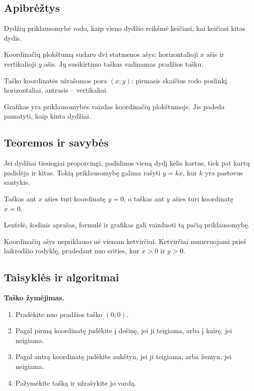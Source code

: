 \subsection{Apibrėžtys}
\begin{apibreztis}
Dydžių priklausomybė rodo, kaip vieno dydžio reikšmė keičiasi, kai keičiasi kitas dydis.
\end{apibreztis}
\begin{apibreztis}
Koordinačių plokštumą sudaro dvi statmenos ašys: horizontalioji \(x\) ašis ir vertikalioji \(y\) ašis. Jų susikirtimo taškas vadinamas pradžios tašku.
\end{apibreztis}
\begin{apibreztis}
Taško koordinatės užrašomos pora \((x;y)\): pirmasis skaičius rodo poslinkį horizontaliai, antrasis -- vertikaliai.
\end{apibreztis}
\begin{apibreztis}
Grafikas yra priklausomybės vaizdas koordinačių plokštumoje. Jis padeda pamatyti, kaip kinta dydžiai.
\end{apibreztis}

\subsection{Teoremos ir savybės}
\begin{savybe}
Jei dydžiai tiesiogiai proporcingi, padidinus vieną dydį kelis kartus, tiek pat kartų padidėja ir kitas. Tokią priklausomybę galima rašyti \(y=kx\), kur \(k\) yra pastovus santykis.
\end{savybe}
\begin{savybe}
Taškas ant \(x\) ašies turi koordinatę \(y=0\), o taškas ant \(y\) ašies turi koordinatę \(x=0\).
\end{savybe}
\begin{savybe}
Lentelė, žodinis aprašas, formulė ir grafikas gali vaizduoti tą pačią priklausomybę.
\end{savybe}
\begin{savybe}
Koordinačių ašys nepriklauso nė vienam ketvirčiui. Ketvirčiai numeruojami prieš laikrodžio rodyklę, pradedant nuo srities, kur \(x>0\) ir \(y>0\).
\end{savybe}

\subsection{Taisyklės ir algoritmai}
\textbf{Taško žymėjimas.}
\begin{enumerate}[label=\arabic*.]
\item Pradėkite nuo pradžios taško \((0;0)\).
\item Pagal pirmą koordinatę judėkite į dešinę, jei ji teigiama, arba į kairę, jei neigiama.
\item Pagal antrą koordinatę judėkite aukštyn, jei ji teigiama, arba žemyn, jei neigiama.
\item Pažymėkite tašką ir užrašykite jo vardą.
\end{enumerate}

